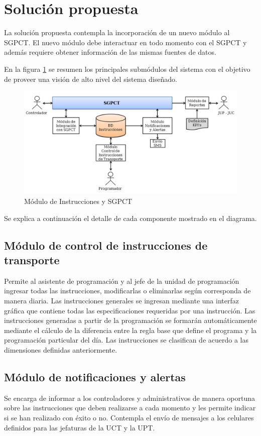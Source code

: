 \documentclass[oneside,12pt, letterpaper, titlepage]{book}
\begin{document}
\section{Solución propuesta}
La solución propuesta contempla la incorporación de un nuevo módulo al SGPCT. El nuevo módulo debe interactuar en todo momento con el SGPCT y además requiere obtener información de las mismas fuentes de datos. 

En la figura \ref{fig:diagramaPTT} se resumen los principales submódulos del sistema con el objetivo de proveer una visión de alto nivel del sistema diseñado. 

\begin{figure}[H]
    \centering
    \includegraphics[scale=0.4]{./images/DiagramaPTT}
    \caption{Módulo de Instrucciones y SGPCT}
    \label{fig:diagramaPTT}
\end{figure}

Se explica a continuación el detalle de cada componente mostrado en el diagrama.

\subsection{Módulo de control de instrucciones de transporte}
Permite al asistente de programación y al jefe de la unidad de programación ingresar todas las instrucciones, modificarlas o eliminarlas según corresponda de manera diaria. Las instrucciones generales se ingresan mediante una interfaz gráfica que contiene todas las especificaciones requeridas por una instrucción. Las instrucciones generadas a partir de la programación se formarán automáticamente mediante el cálculo de la diferencia entre la regla base que define el programa y la programación particular del día. Las instrucciones se clasifican de acuerdo a las dimensiones definidas anteriormente.

\subsection{Módulo de notificaciones y alertas}
Se encarga de informar a los controladores y administrativos de manera oportuna sobre las instrucciones que deben realizarse a cada momento y les permite indicar si se han realizado con éxito o no. Contempla el envío de mensajes a los celulares definidos para las jefaturas de la UCT y la UPT.
\end{document}
